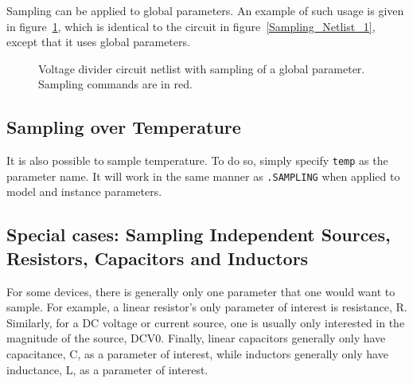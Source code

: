 Sampling can be applied to global parameters.  An example of such usage is given 
in figure~\ref{Sampling_Netlist_3}, which is identical to the circuit in 
figure~\ref{Sampling_Netlist_1}, except that it uses global parameters.
\begin{figure}[htbp]
\begin{centering}
\caption{Voltage divider circuit netlist with sampling of a global parameter.
Sampling commands are in \color{XyceRed}red\color{black}.
\label{Sampling_Netlist_3}}
\end{centering}
\end{figure}

\subsection{Sampling over Temperature}
\label{sampling_Temperature}

It is also possible to sample temperature.  To do so, simply 
specify \verb|temp| as the parameter name.  It will work in the 
same manner as \verb|.SAMPLING| when applied to model and instance 
parameters.

\subsection{Special cases: Sampling Independent Sources, Resistors, Capacitors and Inductors}
\label{sampling_SpecialCases}

For some devices, there is generally only one parameter that one would
want to sample.  For example, a linear resistor's only parameter of
interest is resistance, R.  Similarly, for a DC voltage or current
source, one is usually only interested in the magnitude of the source, DCV0.
Finally, linear capacitors generally only have capacitance, C, as a 
parameter of interest, while inductors generally only have inductance, L,
as a parameter of interest.  

